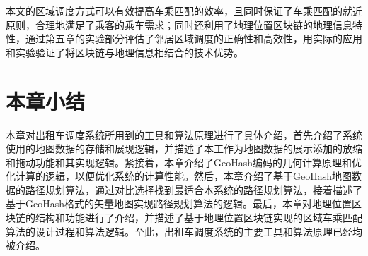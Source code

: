 本文的区域调度方式可以有效提高车乘匹配的效率，且同时保证了车乘匹配的就近原则，合理地满足了乘客的乘车需求；同时还利用了地理位置区块链的地理信息特性，通过第五章的实验部分评估了邻居区域调度的正确性和高效性，用实际的应用和实验验证了将区块链与地理信息相结合的技术优势。

\section{本章小结}
本章对出租车调度系统所用到的工具和算法原理进行了具体介绍，首先介绍了系统使用的地图数据的存储和展现逻辑，并描述了本工作为地图数据的展示添加的放缩和拖动功能和其实现逻辑。紧接着，本章介绍了GeoHash编码的几何计算原理和优化计算的逻辑，以便优化系统的计算性能。然后，本章介绍了基于GeoHash地图数据的路径规划算法，通过对比选择找到最适合本系统的路径规划算法，接着描述了基于GeoHash格式的矢量地图实现路径规划算法的逻辑。最后，本章对地理位置区块链的结构和功能进行了介绍，并描述了基于地理位置区块链实现的区域车乘匹配算法的设计过程和算法逻辑。至此，出租车调度系统的主要工具和算法原理已经均被介绍。
